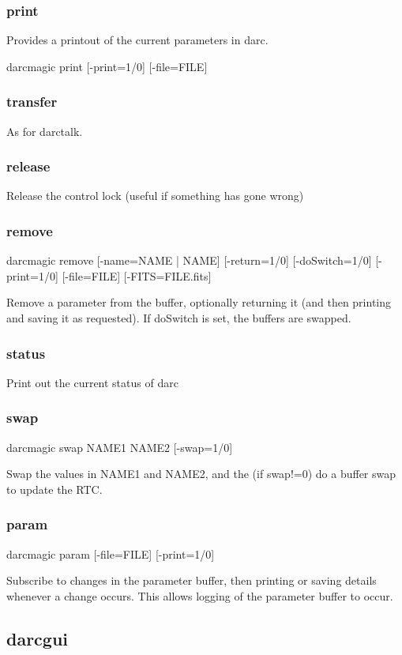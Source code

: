 \documentclass[a4,10pt]{article}
\begin{document}
\subsubsection{print}
Provides a printout of the current parameters in darc.

darcmagic print [-print=1/0] [-file=FILE]



\subsubsection{transfer}
As for darctalk.

\subsubsection{release}
Release the control lock (useful if something has gone wrong)

\subsubsection{remove}
darcmagic remove [-name=NAME | NAME] [-return=1/0] [-doSwitch=1/0]
[-print=1/0] [-file=FILE] [-FITS=FILE.fits]

Remove a parameter from the buffer, optionally returning it (and then
printing and saving it as requested).  If doSwitch is set, the buffers
are swapped.

\subsubsection{status}
Print out the current status of darc
\subsubsection{swap}
darcmagic swap NAME1 NAME2 [-swap=1/0]

Swap the values in NAME1 and NAME2, and the (if swap!=0) do a buffer
swap to update the RTC.

\subsubsection{param}
darcmagic param [-file=FILE] [-print=1/0]

Subscribe to changes in the parameter buffer, then printing or saving
details whenever a change occurs.  This allows logging of the
parameter buffer to occur.

\subsection{darcgui}
\end{document}
